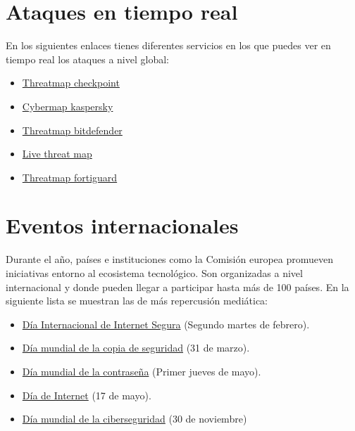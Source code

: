\documentclass[
  a4paper,
  openany]{book}
\begin{document}
\hypertarget{ataques-en-tiempo-real}{%
\section{Ataques en tiempo real}\label{ataques-en-tiempo-real}}

En los siguientes enlaces tienes diferentes servicios en los que puedes ver en tiempo real los ataques a nivel global:

\begin{itemize}
\item
  \href{https://threatmap.checkpoint.com/}{Threatmap checkpoint}
\item
  \href{https://cybermap.kaspersky.com/es}{Cybermap kaspersky}
\item
  \href{https://threatmap.bitdefender.com/}{Threatmap bitdefender}
\item
  \href{https://livethreatmap.radware.com/}{Live threat map}
\item
  \href{https://threatmap.fortiguard.com/}{Threatmap fortiguard}
\end{itemize}

\hypertarget{eventos-internacionales}{%
\section{Eventos internacionales}\label{eventos-internacionales}}

Durante el año, países e instituciones como la Comisión europea promueven iniciativas entorno al ecosistema tecnológico. Son organizadas a nivel internacional y donde pueden llegar a participar hasta más de 100 países. En la siguiente lista se muestran las de más repercusión mediática:

\begin{itemize}
\item
  \href{https://es.wikipedia.org/wiki/Día_Internacional_de_Internet_Segura}{Día Internacional de Internet Segura} (Segundo martes de febrero).
\item
  \href{https://www.incibe.es/empresas/blog/dia-mundial-del-backup-repasamos-importancia-las-copias-seguridad}{Día mundial de la copia de seguridad} (31 de marzo).
\item
  \href{https://es.wikipedia.org/wiki/Día_mundial_de_la_contraseña}{Día mundial de la contraseña} (Primer jueves de mayo).
\item
  \href{https://es.wikipedia.org/wiki/Día_de_Internet}{Día de Internet} (17 de mayo).
\item
  \href{https://www.santanderconsumer.es/simplefinance/blog/tu-futuro/ciberseguridad/post/30-de-noviembre-dia-mundial-de-la-ciberseguridad}{Día mundial de la ciberseguridad} (30 de noviembre)
\end{itemize}
\end{document}
